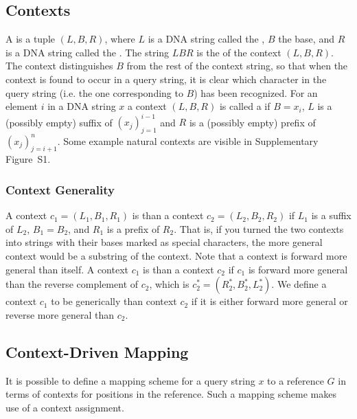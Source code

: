 \subsection{Contexts}
A  is a tuple $(L, B, R)$, where $L$ is a DNA string called the , $B$ the base, and $R$ is a DNA string called the . The string $LBR$ is the  of the context $(L, B, R)$. The context distinguishes $B$ from the rest of the context string, so that when the context is found to occur in a query string, it is clear which character in the query string (i.e. the one corresponding to $B$) has been recognized.
For an element $i$ in a DNA string $x$ a context $(L, B, R)$ is called a  if $B=x_i$,  $L$ is a (possibly empty) suffix of $(x_j)_{j=1}^{i-1}$ and $R$ is a (possibly empty) prefix of $(x_j)_{j=i+1}^n$. Some example natural contexts are visible in Supplementary Figure~S1. %


\subsubsection{Context Generality}
A context $c_1 = (L_1, B_1, R_1)$ is  than a context $c_2 = (L_2, B_2, R_2)$ if $L_1$ is a suffix of $L_2$, $B_1 = B_2$, and $R_1$ is a prefix of $R_2$. That is, if you turned the two contexts into strings with their bases marked as special characters, the more general context would be a substring of the  context. Note that a context is forward more general than itself. A context $c_1$ is  than a context $c_2$ if $c_1$ is forward more general than the reverse complement of $c_2$, which is $c_2^* = (R_2^*, B_2^*, L_2^*)$. We define a context $c_1$ to be generically  than context $c_2$ if it is either forward more general or reverse more general than $c_2$. 

\subsection{Context-Driven Mapping}
It is possible to define a mapping scheme for a query string $x$ to a reference $G$ in terms of contexts for positions in the reference. Such a mapping scheme makes use of a context assignment.

